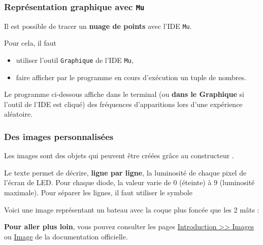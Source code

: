 \subsubsection{Représentation graphique avec \texttt{Mu}}

Il est possible de tracer un \textbf{nuage de points} avec l'IDE \texttt{Mu}.

Pour cela, il faut 
\begin{itemize}
    \item utiliser l'outil \texttt{Graphique} de l'IDE \texttt{Mu},
    \item faire afficher par le programme en cours d'exécution un tuple de nombres.
\end{itemize}


\begin{methode}
Le programme ci-dessous affiche dans le terminal (ou \textbf{dans le Graphique} si l'outil de l'IDE est cliqué) des fréquences d'apparitions lors d'une expérience aléatoire.
\end{methode}



\subsubsection{Des images personnalisées}

Les images sont des objets qui peuvent être créées grâce au constructeur .\par
Le texte  permet de décrire, \textbf{ligne par ligne}, la luminosité de chaque pixel de l'écran de LED. Pour chaque diode, la valeur varie de 0 (éteinte) à 9 (luminosité maximale). Pour séparer les lignes, il faut utiliser le symbole 

\begin{methode}
Voici une image représentant un bateau avec la coque plus foncée que les 2 mâts :
\end{methode}

\begin{remarque}
\textbf{Pour aller plus loin}, vous pouvez consulter les pages  \href{https://microbit-micropython.readthedocs.io/fr/latest/tutorials/images.html}{Introduction >> Images} ou \href{https://microbit-micropython.readthedocs.io/fr/latest/image.html}{Image} de la documentation officielle.
\end{remarque}


